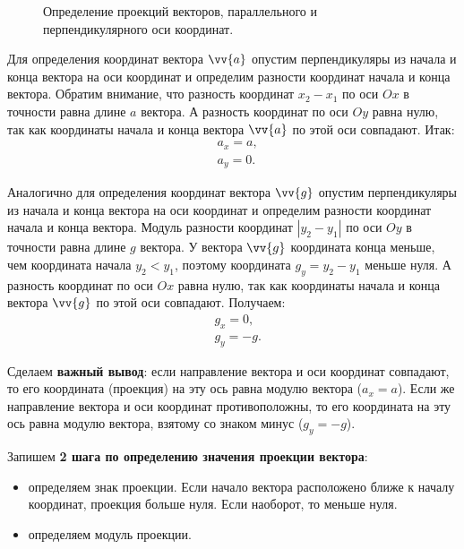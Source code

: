 \begin{figure}[h]
  \caption{\small Определение проекций векторов, параллельного и перпендикулярного
    оси координат.}\label{pic:vec_coord0}
\end{figure}

Для определения координат вектора $\vv{a}$ опустим перпендикуляры из начала и конца
вектора на оси координат и определим разности координат начала и конца вектора.
Обратим внимание, что разность координат $x_2-x_1$ по оси $Ox$ в точности
равна длине $a$ вектора. А разность координат по оси $Oy$ равна нулю, так как
координаты начала и конца вектора $\vv{a}$ по этой оси совпадают.
Итак:
\begin{align*}
  &a_x = a,\\
  &a_y = 0.
\end{align*}

Аналогично для определения координат вектора $\vv{g}$ опустим перпендикуляры из начала и конца
вектора на оси координат и определим разности координат начала и конца вектора.
Модуль разности координат $|y_2-y_1|$ по оси $Oy$ в точности
равна длине $g$ вектора. У вектора $\vv{g}$ координата конца меньше,
чем координата начала $y_2<y_1$, поэтому координата $g_y=y_2-y_1$ меньше нуля.
А разность координат по оси $Ox$ равна нулю, так как
координаты начала и конца вектора $\vv{g}$ по этой оси совпадают.
Получаем:
\begin{align*}
  &g_x  = 0,\\
  &g_y = -g.
\end{align*}

Сделаем \textbf{важный вывод}:
если направление вектора и оси координат совпадают, то его координата
(проекция) на эту ось равна модулю вектора ($a_x = a$).
Если же направление вектора и оси координат противоположны, то его координата
на эту ось равна модулю вектора, взятому со знаком минус ($g_y = -g$).

Запишем \textbf{2 шага по определению значения проекции вектора}:
\begin{itemize}
\item определяем знак проекции. Если начало вектора расположено ближе к началу
  координат, проекция больше нуля. Если наоборот, то меньше нуля.
  \item определяем модуль проекции.
\end{itemize}

